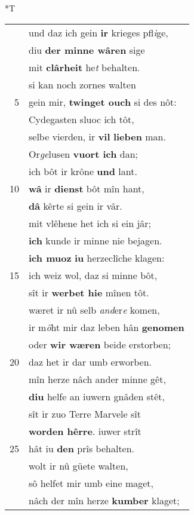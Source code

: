 \documentclass[8pt,a4paper,notitlepage]{article}
\begin{document}
\begin{table}[ht]
\begin{minipage}[t]{0.5\linewidth}
\small
\begin{center}*T
\end{center}
\begin{tabular}{rl}
 & und daz ich gein \textbf{ir} krieges pfl\textit{i}ge,\\ 
 & diu \textbf{der minne wâren} sige\\ 
 & mit \textbf{clârheit} he\textit{t} behalten.\\ 
 & si kan noch zornes walten\\ 
5 & gein mir, \textbf{twinget ouch} si des nôt:\\ 
 & Cydegasten sluoc ich tôt,\\ 
 & selbe vierden, ir \textbf{vil} \textbf{lieben} man.\\ 
 & Or\textit{ge}lusen \textbf{vuort ich} dan;\\ 
 & ich bôt ir krône \textbf{und} lant.\\ 
10 & \textbf{wâ} ir \textbf{dienst} bôt mîn hant,\\ 
 & \textbf{dâ} kêrte si gein ir vâr.\\ 
 & mit vlêhene het ich si ein jâr;\\ 
 & \textbf{ich} kunde ir minne nie bejagen.\\ 
 & \textbf{ich muoz} \textbf{iu} herzeclîche klagen:\\ 
15 & ich weiz wol, daz si minne bôt,\\ 
 & sît ir \textbf{werbet hie} mînen tôt.\\ 
 & wæret ir nû selb \textit{and}er\textit{e} komen,\\ 
 & ir m\textit{ö}ht mir daz leben hân \textbf{genomen}\\ 
 & oder \textbf{wir wæren} beide erstorben;\\ 
20 & daz het ir dar umb erworben.\\ 
 & mîn herze nâch ander minne gêt,\\ 
 & \textbf{diu} helfe an iuwern gnâden stêt,\\ 
 & sît ir zuo Terre Marvele sît\\ 
 & \textbf{worden hêrre}. iuwer strît\\ 
25 & hât iu \textbf{den} prîs behalten.\\ 
 & wolt ir nû güete walten,\\ 
 & sô helfet mir umb eine maget,\\ 
 & nâch der mîn herze \textbf{kumber} klaget;\\ 

\end{tabular}
\end{minipage}
\end{table}
\end{document}
